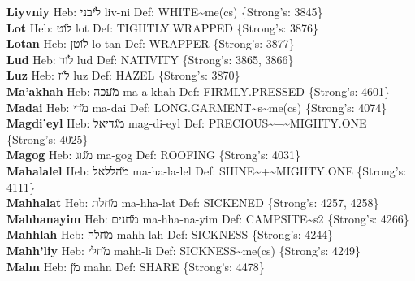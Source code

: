 {\textbf{Liyvniy} Heb: {\large\H ליבני} liv-ni Def: WHITE\textasciitilde{}me(cs) \{Strong's: 3845\}\hfill{}\\

\textbf{Lot} Heb: {\large\H לוט} lot Def: TIGHTLY.WRAPPED \{Strong's: 3876\}\hfill{}\\

\textbf{Lotan} Heb: {\large\H לוטן} lo-tan Def: WRAPPER \{Strong's: 3877\}\hfill{}\\

\textbf{Lud} Heb: {\large\H לוד} lud Def: NATIVITY \{Strong's: 3865, 3866\}\hfill{}\\

\textbf{Luz} Heb: {\large\H לוז} luz Def: HAZEL \{Strong's: 3870\}\hfill{}\\

\textbf{Ma'akhah} Heb: {\large\H מעכה} ma-a-khah Def: FIRMLY.PRESSED \{Strong's: 4601\}\hfill{}\\

\textbf{Madai} Heb: {\large\H מדי} ma-dai Def: LONG.GARMENT\textasciitilde{}s\textasciitilde{}me(cs) \{Strong's: 4074\}\hfill{}\\

\textbf{Magdi'eyl} Heb: {\large\H מגדיאל} mag-di-eyl Def: PRECIOUS\textasciitilde{}+\textasciitilde{}MIGHTY.ONE \{Strong's: 4025\}\hfill{}\\

\textbf{Magog} Heb: {\large\H מגוג} ma-gog Def: ROOFING \{Strong's: 4031\}\hfill{}\\

\textbf{Mahalalel} Heb: {\large\H מהללאל} ma-ha-la-lel Def: SHINE\textasciitilde{}+\textasciitilde{}MIGHTY.ONE \{Strong's: 4111\}\hfill{}\\

\textbf{Mahhalat} Heb: {\large\H מחלת} ma-hha-lat Def: SICKENED \{Strong's: 4257, 4258\}\hfill{}\\

\textbf{Mahhanayim} Heb: {\large\H מחנים} ma-hha-na-yim Def: CAMPSITE\textasciitilde{}s2 \{Strong's: 4266\}\hfill{}\\

\textbf{Mahhlah} Heb: {\large\H מחלה} mahh-lah Def: SICKNESS \{Strong's: 4244\}\hfill{}\\

\textbf{Mahh'liy} Heb: {\large\H מחלי} mahh-li Def: SICKNESS\textasciitilde{}me(cs) \{Strong's: 4249\}\hfill{}\\

\textbf{Mahn} Heb: {\large\H מן} mahn Def: SHARE \{Strong's: 4478\}\hfill{}\\

}
